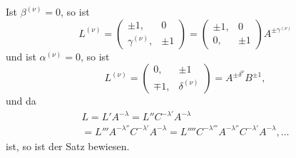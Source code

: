Ist $\beta^{(\nu)} = 0$, so ist
\[
L^{(\nu)} = \begin{pmatrix}\pm 1, & 0\\\gamma^{(\nu)}, & \pm 1\end{pmatrix} = \begin{pmatrix}\pm 1, & 0\\0, & \pm 1\end{pmatrix} A^{\pm\gamma^{(\nu)}}
\]
und ist $\alpha^{(\nu)} = 0$, so ist
\[
L^{(\nu)} = \begin{pmatrix}0, & \pm 1\\\mp 1, & \delta^{(\nu)}\end{pmatrix} = A^{\pm\delta^\nu} B^{\pm 1},
\]
und da
\[
\begin{gathered}
L = L'A^{-\lambda} = L''C^{-\lambda'}A^{-\lambda}\\
= L'''A^{-\lambda''}C^{-\lambda'}A^{-\lambda} = L''''C^{-\lambda'''}A^{-\lambda''}C^{-\lambda'}A^{-\lambda}, \dots
\end{gathered}
\]
ist, so ist der Satz bewiesen.
